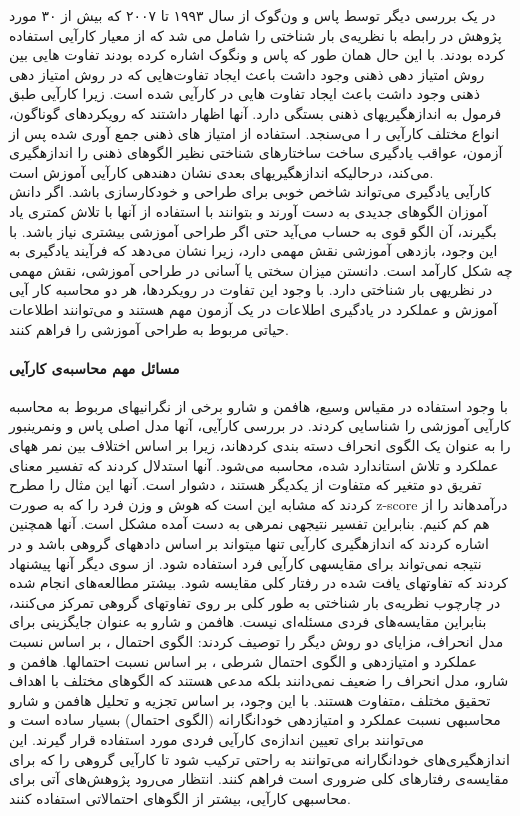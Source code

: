 در یک بررسی دیگر توسط پاس و ون‌گوک از سال ۱۹۹۳ تا ۲۰۰۷ که بیش از ۳۰ مورد پژوهش در رابطه با نظریه‌ی بار شناختی را شامل می شد که از معیار کارآیی استفاده کرده بودند. با این حال همان طور که پاس و ونگوک اشاره کرده بودند تفاوت هایی بین روش امتیاز دهی ذهنی وجود داشت باعث ایجاد تفاوت‌هایی که در روش امتیاز دهی ذهنی وجود داشت باعث ایجاد تفاوت هایی در کارآیی شده است. زیرا كارآیی طبق  فرمول  به 
اندازهگيریهای ذهنی بستگی دارد. آنها اظهار داشتند كه رویکردهای گوناگون، انواع مختلف كارآیی ر ا 
می‌سنجد.  استفاده  از  امتياز های ذهنی  جمع آوری شده  پس از  آزمون،  عواقب  یادگيری ساخت
ساختارهای شناختی نظير الگوهای ذهنی را اندازهگيری می‌كند، درحالیكه اندازهگيریهای بعدی نشان
دهندهی كارآیی آموزش است.
\cite{van2008instructional}
\\
كارآیی یادگيری می‌تواند شاخص خوبی برای طراحی و خودكارسازی باشد. اگر دانش آموزان الگوهای
جدیدی به دست آورند و بتوانند با استفاده از آنها با تلاش كمتری یاد بگيرند، آن الگو قوی به حساب
می‌آید حتی اگر طراحی آموزشی بيشتری نياز باشد. با این وجود، بازدهی آموزشی نقش مهمی دارد، زیرا
نشان می‌دهد كه فرآیند یادگيری به چه شکل كارآمد است. دانستن ميزان سختی یا آسانی در طراحی
آموزشی، نقش مهمی در نظریهی بار شناختی دارد. با وجود این تفاوت در رویکردها، هر دو محاسبه كار آیی
آموزش و عملکرد در یادگيری اطلاعات در یک آزمون مهم هستند و می‌توانند اطلاعات حياتی مربوط به 
طراحی آموزشی را فراهم كنند.
\cite{sweller2011measuring}
\paragraph{مسائل مهم محاسبه‌ی کارآیی}
با وجود استفاده در مقياس وسيع، هافمن و شارو برخی از نگرانیهای مربوط به محاسبه كارآیی
آموزشی را شناسایی كردند. در بررسی كارآیی، آنها مدل اصلی پاس و ونمرینبور را به عنوان یک الگوی
انحراف
دسته بندی كردهاند، زیرا بر اساس اختلاف بين نمر ههای عملکرد و تلاش استاندارد شده، 
محاسبه می‌شود. آنها استدلال كردند كه تفسير معنای تفریق دو متغير كه متفاوت از یکدیگر هستند ،
دشوار است. آنها این مثال را مطرح كردند كه مشابه این است كه هوش و وزن فرد را كه به صورت z-score
درآمدهاند را از هم كم كنيم. بنابراین تفسير نتيجهی نمرهی به دست آمده مشکل است.
\cite{hoffman2010conceptions}
آنها همچنين اشاره كردند كه اندازهگيری كارآیی تنها میتواند بر اساس دادههای گروهی باشد و در
نتيجه نمی‌تواند برای مقایسهی كارآیی فرد استفاده شود. از سوی دیگر آنها پيشنهاد كردند كه تفاوتهای
یافت شده در رفتار كلی مقایسه شود. بيشتر مطالعه‌های انجام شده در چارچوب نظریه‌ی بار شناختی به طور
كلی بر روی تفاوتهای گروهی تمركز می‌كنند، بنابراین مقایسه‌های فردی مسئله‌ای نيست. هافمن و شارو به عنوان جایگزینی برای مدل انحراف، مزایای دو روش دیگر را توصيف كردند: الگوی احتمال ،
بر اساس 
نسبت عملکرد و امتيازدهی و الگوی احتمال شرطی ،
بر اساس نسبت احتمالها.
\cite{hoffman2010conceptions}
هافمن و شارو، مدل انحراف را  ضعيف نمی‌دانند بلکه مدعی هستند كه الگوهای مختلف با اهداف 
تحقيق مختلف ،متفاوت هستند. با این وجود، بر اساس تجزیه و تحليل هافمن و شارو محاسبهی نسبت 
عملکرد  و  امتيازدهی خودانگارانه (الگوی احتمال) بسيار ساده  است  و  می‌توانند برای تعيين اندازه‌ی
كارآیی فردی مورد استفاده قرار گيرند. این اندازهگيری‌های خودانگارانه می‌توانند به راحتی تركيب شود تا 
كارآیی گروهی را كه برای مقایسه‌ی رفتارهای كلی ضروری است فراهم كنند. انتظار می‌رود پژوهش‌های
آتی برای محاسبهی كارآیی، بيشتر از الگوهای احتمالاتی استفاده كنند.
\cite{hoffman2010conceptions}
